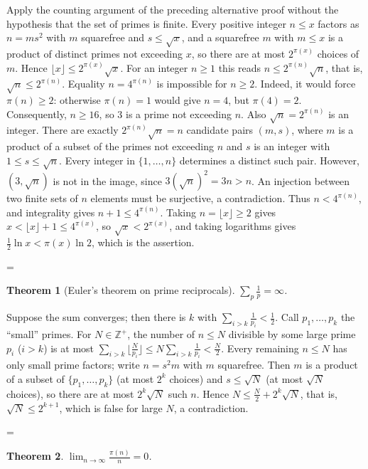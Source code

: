 \documentclass[11pt]{article}
\makeatletter
\theoremstyle{ntstyle}
\newtheorem{theorem}{Theorem}[subsection]
\let\nt@closedisplay\]
\def\nt@guardedclose{\@ifnextchar\par{\nt@closeafterpar}{\@ifnextchar\end{\postdisplaypenalty\@M\nt@closedisplay}{\nt@closedisplay}}}
\def\nt@closeafterpar\par{\@ifnextchar\par{\nt@closeafterpar}{\@ifnextchar\end{\postdisplaypenalty\@M\nt@closedisplay\par}{\nt@closedisplay\par}}}
\renewenvironment{proof}[1][\proofname]{\par
  \pushQED{\qed}\normalfont\topsep\medskipamount\edef\nt@afterproof{\@endparpenalty=\the\@endparpenalty\relax}\@beginparpenalty\@M\@endparpenalty\@M\let\]\nt@guardedclose\trivlist\item[]\textit{#1\@addpunct{.}} \ignorespaces}{\ifvmode\addpenalty\@M\fi\popQED\nt@afterproof\endtrivlist\@endpefalse}
\makeatother
\begin{document}
\begin{proof} Apply the counting argument of the preceding
	alternative proof without the hypothesis that the set of primes is finite.
	Every positive integer $n\le x$ factors as $n=ms^{2}$ with $m$ squarefree and
	$s\le\sqrt{x}$, and a squarefree $m$ with $m \le x$ is a product of distinct
	primes not exceeding $x$, so there are at most $2^{\pi(x)}$ choices of $m$.
	Hence $\lfloor x\rfloor\le 2^{\pi(x)}\sqrt{x}$. For an integer $n\ge1$ this
	reads $n\le 2^{\pi(n)}\sqrt{n}$, that is, $\sqrt{n}\le 2^{\pi(n)}$. Equality $n=4^{\pi(n)}$ is impossible for $n\ge2$.
	Indeed, it would force $\pi(n)\ge2$: otherwise $\pi(n)=1$
	would give $n=4$, but $\pi(4)=2$.
	Consequently, $n\ge16$, so $3$ is a prime not exceeding $n$.
	Also $\sqrt n=2^{\pi(n)}$ is an integer. There are exactly
	$2^{\pi(n)}\sqrt n=n$ candidate pairs $(m,s)$, where $m$ is
	a product of a subset of the primes not exceeding $n$ and
	$s$ is an integer with $1\le s\le\sqrt n$.
	Every integer in $\{1,\ldots,n\}$ determines a distinct such pair.
	However, $(3,\sqrt n)$ is not in the image, since
	$3(\sqrt n)^2=3n>n$. An injection between two finite sets of
	$n$ elements must be surjective, a contradiction.
	Thus $n<4^{\pi(n)}$, and integrality gives $n+1\le4^{\pi(n)}$. Taking
	$n=\lfloor x\rfloor\ge2$ gives $x<\lfloor x\rfloor+1\le 4^{\pi(x)}$, so
	$\sqrt{x}<2^{\pi(x)}$, and taking logarithms gives
	$\tfrac12\ln x<\pi(x)\ln 2$, which is the assertion.

\end{proof}
\begin{theorem}[Euler's theorem on prime reciprocals]\label{thm:9.6.2} $\sum_{p} \tfrac{1}{p} = \infty$.

\end{theorem}

\begin{proof} Suppose the sum converges; then there is
	$k$ with $\sum_{i>k}\tfrac{1}{p_i} < \tfrac{1}{2}$. Call $p_1,\ldots,p_k$
	the ``small'' primes. For $N \in \mathbb{Z}^+$, the number of $n \le N$
	divisible by some large prime $p_i$ ($i>k$) is at most
	$\sum_{i>k}\big\lfloor \tfrac{N}{p_i}\big\rfloor \le
		N\sum_{i>k}\tfrac{1}{p_i} < \tfrac{N}{2}$. Every remaining $n \le N$
	has only small prime factors; write $n = s^2 m$ with $m$
	squarefree. Then $m$ is a product of a subset of $\{p_1,\ldots,p_k\}$ (at
	most $2^k$ choices) and $s \le \sqrt{N}$ (at most $\sqrt{N}$ choices),
	so there are at most $2^k\sqrt{N}$ such $n$. Hence $N \le \tfrac{N}{2}
		+ 2^k\sqrt{N}$, that is, $\sqrt{N} \le 2^{k+1}$, which is false for large $N$, a
	contradiction.

\end{proof}
\begin{theorem}\label{thm:9.6.3}
	$\lim_{n\to\infty}\tfrac{\pi(n)}{n} = 0$.

\end{theorem}
\end{document}
